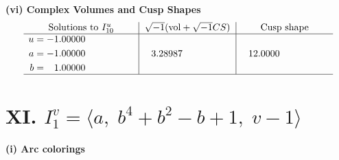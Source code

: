 \documentclass[1p]{elsarticle_modified}
\theoremstyle{definition}
\newcommand{\I}{\sqrt{-1}}
\begin{document}
\newpage\flushleft \textbf{(vi) Complex Volumes and Cusp Shapes}
$$\begin{array}{c|c|c}  
\text{Solutions to }I^u_{10}& \I (\text{vol} + \sqrt{-1}CS) & \text{Cusp shape}\\
 \hline 
\begin{aligned}
u &= -1.00000\phantom{ +0.000000I} \\
a &= -1.00000\phantom{ +0.000000I} \\
b &= \phantom{-}1.00000\phantom{ +0.000000I}\end{aligned}
 & \phantom{-}3.28987\phantom{ +0.000000I} & \phantom{-}12.0000\phantom{ +0.000000I}\\
 \hline 
 \end{array}$$\newpage\newpage\renewcommand{\arraystretch}{1}
\centering \section*{XI. $I^v_{1}= \langle a,\;b^4+b^2- b+1,\;v-1 \rangle$}
\flushleft \textbf{(i) Arc colorings}\\
\end{document}
